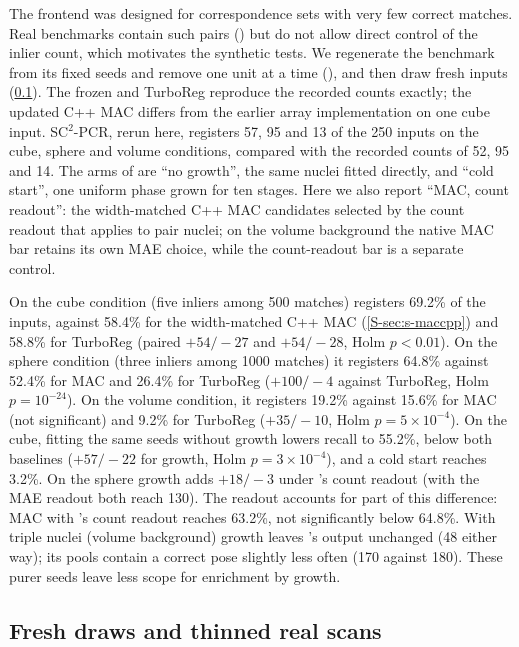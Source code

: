 The frontend was designed for correspondence sets with very few correct matches. Real benchmarks contain such pairs () but do not allow direct control of the inlier count, which motivates the synthetic tests. We regenerate the benchmark from its fixed seeds and remove one unit at a time (), and then draw fresh inputs (\cref{S-sec:s-fresh}). The frozen \ngr{} and TurboReg reproduce the recorded counts exactly; the updated C++ MAC differs from the earlier array implementation on one cube input. SC$^2$-PCR, rerun here, registers 57, 95 and 13 of the 250 inputs on the cube, sphere and volume conditions, compared with the recorded counts of 52, 95 and 14. The arms of  are ``no growth'', the same nuclei fitted directly, and ``cold start'', one uniform phase grown for ten stages. Here we also report ``MAC, count readout'': the width-matched C++ MAC candidates selected by the count readout that \ngr{} applies to pair nuclei; on the volume background the native MAC bar retains its own MAE choice, while the count-readout bar is a separate control.

On the cube condition (five inliers among 500 matches) \ngr{} registers 69.2\% of the inputs, against 58.4\% for the width-matched C++ MAC (\cref{S-sec:s-maccpp}) and 58.8\% for TurboReg (paired $+54/-27$ and $+54/-28$, Holm $p<0.01$). On the sphere condition (three inliers among 1000 matches) it registers 64.8\% against 52.4\% for MAC and 26.4\% for TurboReg ($+100/-4$ against TurboReg, Holm $p=10^{-24}$). On the volume condition, it registers 19.2\% against 15.6\% for MAC (not significant) and 9.2\% for TurboReg ($+35/-10$, Holm $p=5\times10^{-4}$). On the cube, fitting the same seeds without growth lowers recall to 55.2\%, below both baselines ($+57/-22$ for growth, Holm $p=3\times10^{-4}$), and a cold start reaches 3.2\%. On the sphere growth adds $+18/-3$ under \ngr{}'s count readout (with the MAE readout both reach 130). The readout accounts for part of this difference: MAC with \ngr{}'s count readout reaches 63.2\%, not significantly below 64.8\%. With triple nuclei (volume background) growth leaves \ngr{}'s output unchanged (48 either way); its pools contain a correct pose slightly less often (170 against 180). These purer seeds leave less scope for enrichment by growth.

\subsection{Fresh draws and thinned real scans}
\label{S-sec:s-fresh}

